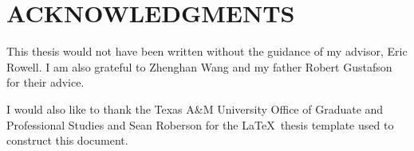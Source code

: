 %
%
%
%


\chapter*{ACKNOWLEDGMENTS}


\indent This thesis would not have been written without the guidance of my advisor, Eric Rowell.  I am also grateful to Zhenghan Wang and my father Robert Gustafson for their advice. 

I would also like to thank the Texas A\&M University Office of Graduate and Professional Studies and Sean Roberson for the \LaTeX\ thesis template used to construct this document.



\pagebreak{}
